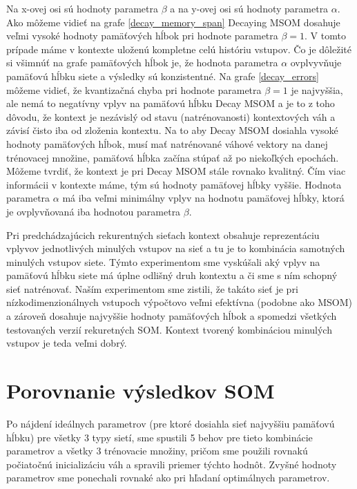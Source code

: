     
Na x-ovej osi sú hodnoty parametra $\beta$ a na y-ovej osi sú hodnoty parametra $\alpha$.
Ako môžeme vidieť na grafe \ref{decay_memory_span} Decaying MSOM dosahuje veľmi vysoké hodnoty pamäťových hĺbok pri hodnote 
parametra $\beta = 1$. V tomto prípade máme v kontexte uloženú kompletne celú históriu vstupov. Čo je dôležité si všimnúť na grafe
pamäťových hĺbok je, že hodnota parametra $\alpha$ ovplvyvňuje pamäťovú hĺbku siete a výsledky sú konzistentné.
Na grafe \ref{decay_errors} môžeme vidieť, že kvantizačná chyba pri hodnote parametra $\beta = 1$ je najvyššia, ale nemá to negatívny 
vplyv na pamäťovú hĺbku Decay MSOM a je to z toho dôvodu, že kontext je nezávislý od stavu (natrénovanosti) kontextových váh a závisí čisto iba od zloženia kontextu.
Na to aby Decay MSOM dosiahla vysoké hodnoty pamäťových hĺbok, musí mať natrénované váhové vektory na danej trénovacej množine, pamäťová hĺbka začína stúpať až
po niekoľkých epochách.
Môžeme tvrdiť, že kontext je pri Decay MSOM stále rovnako kvalitný. Čím viac informácii v kontexte máme, tým sú hodnoty pamäťovej hĺbky vyššie.
Hodnota parametra $\alpha$ má iba veľmi minimálny vplyv na hodnotu pamäťovej hĺbky, ktorá je ovplyvňovaná iba hodnotou parametra $\beta$.

Pri predchádzajúcich rekurentných sieťach kontext obsahuje reprezentáciu vplyvov jednotlivých minulých vstupov na sieť a tu je to kombinácia samotných minulých vstupov siete. 
Týmto experimentom sme vyskúšali aký vplyv na pamäťovú hĺbku siete má úplne odlišný druh kontextu a či sme s ním schopný sieť natrénovať.
Naším experimentom sme zistili, že takáto sieť je pri nízkodimenzionálnych vstupoch výpočtovo veľmi efektívna (podobne ako MSOM) a zároveň dosahuje 
najvyššie hodnoty pamäťových hĺbok a spomedzi všetkých testovaných verzií rekuretných SOM.
Kontext tvorený kombináciou minulých vstupov je teda veľmi dobrý.



\section {Porovnanie výsledkov SOM}
Po nájdení ideálnych parametrov (pre ktoré dosiahla sieť najvyššiu pamäťovú hĺbku) pre všetky 3 typy sietí, sme spustili 5 behov pre tieto kombinácie parametrov a všetky 3 trénovacie množiny,
pričom sme použili rovnakú počiatočnú inicializáciu váh a spravili priemer týchto hodnôt. Zvyšné hodnoty parametrov sme ponechali
rovnaké ako pri hľadaní optimálnych parametrov.

